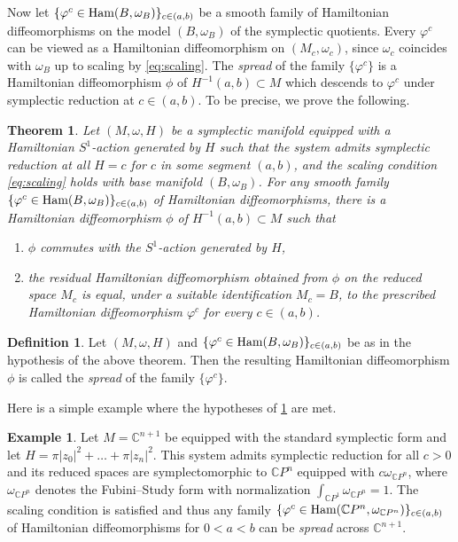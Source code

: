\documentclass[10pt,oneside,reqno]{amsart}
\newtheorem{theoremletter}{Theorem}
\theoremstyle{definition}
\newtheorem{definition}[theorem]{Definition}
\newtheorem{example}[theorem]{Example}
\newcommand{\C}{\mathbb{C}}
\newcommand{\Ham}{\textup{Ham}}
\begin{document}
Now let $\{\varphi^c \in \Ham(B,\omega_B)\}_{c \in (a,b)}$ be a smooth family of Hamiltonian diffeomorphisms on the model $(B,\omega_B)$ of the symplectic quotients. Every $\varphi^c$ can be viewed as a Hamiltonian diffeomorphism on $(M_c,\omega_c)$, since $\omega_c$ coincides with $\omega_B$ up to scaling by \eqref{eq:scaling}. The \emph{spread} of the family $\{\varphi^c\}$ is a Hamiltonian diffeomorphism $\phi$ of $H^{-1}(a,b) \subset M$ which descends to $\varphi^c$ under symplectic reduction at $c\in (a,b)$. To be precise, we prove the following.
\begin{theoremletter}
    \label{thm:mainC}
    Let $(M,\omega,H)$ be a symplectic manifold equipped with a Hamiltonian $S^1$-action generated by $H$ such that the system admits symplectic reduction at all $H=c$ for $c$ in some segment $(a,b)$, and the scaling condition \eqref{eq:scaling} holds with base manifold $(B,\omega_B)$. For any smooth family $\{\varphi^c \in \Ham(B,\omega_B)\}_{c \in (a,b)}$ of Hamiltonian diffeomorphisms, there is a Hamiltonian diffeomorphism $\phi$ of $H^{-1}(a,b) \subset M$ such that
    \begin{enumerate}
        \item $\phi$ commutes with the $S^1$-action generated by $H$,
        \item the residual Hamiltonian diffeomorphism obtained from $\phi$ on the reduced space $M_c$ is equal, under a suitable identification $M_c = B$, to the prescribed Hamiltonian diffeomorphism $\varphi^c$ for every $c \in (a,b)$.
    \end{enumerate}
\end{theoremletter}

\begin{definition}
    Let $(M,\omega,H)$ and $\{\varphi^c \in \Ham(B,\omega_B)\}_{c \in (a,b)}$ be as in the hypothesis of the above theorem. Then the resulting Hamiltonian diffeomorphism $\phi$ is called the \emph{spread} of the family $\{\varphi^c\}$.
\end{definition}

Here is a simple example where the hypotheses of \cref{thm:mainC} are met. 

\begin{example}
   Let $M = \C^{n+1}$ be equipped with the standard symplectic form and let $H = \pi \vert z_0 \vert^2 + \ldots + \pi \vert z_n \vert^2$. This system admits symplectic reduction for all $c > 0$ and its reduced spaces are symplectomorphic to $\C P^n$ equipped with $c \omega_{\C P^n}$, where $\omega_{\C P^n}$ denotes the Fubini--Study form with normalization $\int_{\C P^1} \omega_{\C P^n} = 1$. The scaling condition is satisfied and thus any family $\{\varphi^c \in \Ham(\C P^n,\omega_{\C P^n})\}_{c \in (a,b)}$ of Hamiltonian diffeomorphisms for $0 < a < b$ can be \emph{spread} across $\C^{n+1}$.
\end{example}
\end{document}
